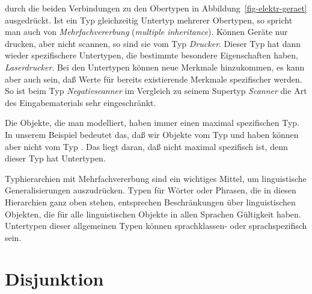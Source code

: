 durch die beiden Verbindungen zu den Obertypen in Abbildung~\ref{fig-elektr-geraet} ausgedrückt.
Ist ein Typ gleichzeitig Untertyp mehrerer Obertypen, so spricht man auch von \emph{Mehrfachvererbung}
(\emph{multiple inheritance}). Können Geräte nur drucken, aber nicht scannen, so sind sie vom Typ
\emph{Drucker}. Dieser Typ hat dann wieder spezifischere Untertypen, die bestimmte besondere Eigenschaften
haben, \zb \textit{Laserdrucker}. Bei den Untertypen können neue Merkmale hinzukommen, es kann aber
auch sein, daß Werte für bereits existierende Merkmale spezifischer werden. So ist \zb beim
Typ \textit{Negativscanner} im Vergleich zu seinem Supertyp \textit{Scanner} 
die Art des Eingabematerials sehr eingeschränkt. 

Die Objekte, die man modelliert, haben immer einen maximal spezifischen Typ. In unserem Beispiel
bedeutet das, daß wir Objekte vom Typ  und  haben können aber nicht
vom Typ . Das liegt daran, daß  nicht maximal
spezifisch ist, denn dieser Typ hat Untertypen.

Typhierarchien mit Mehrfachvererbung sind ein wichtiges Mittel, um linguistische Generalisierungen
auszudrücken. Typen für Wörter oder Phrasen, die in diesen Hierarchien ganz oben stehen, entsprechen
Beschränkungen über linguistischen Objekten, die für alle linguistischen Objekte in allen Sprachen
Gültigkeit haben. Untertypen dieser allgemeinen Typen können sprachklassen- oder sprachspezifisch sein.%

\section{Disjunktion}

